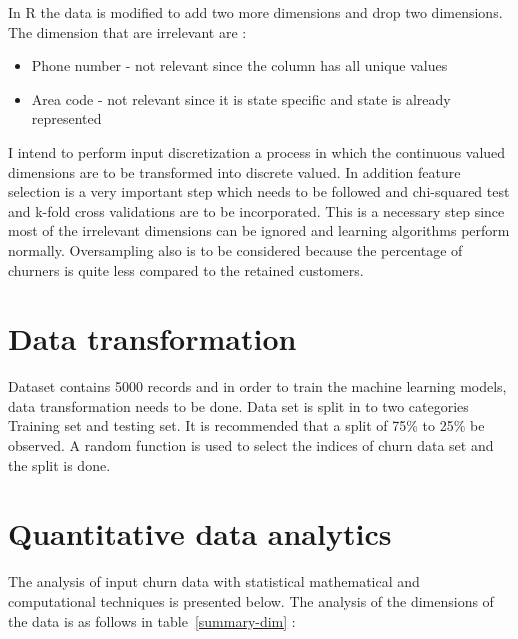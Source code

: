 In R the data is modified to add two more dimensions and drop two dimensions. 
The dimension that are irrelevant are :
\begin{itemize}
	\item Phone number - not relevant since the column has all unique values
	\item Area code - not relevant since it is state specific and state is already represented
\end{itemize}

I intend to perform input discretization a process in which the continuous valued dimensions are to be transformed into discrete valued. 
In addition feature selection is a very important step which needs to be followed and chi-squared test and k-fold cross validations are to be incorporated. This is a necessary step since most of the irrelevant dimensions can be ignored and learning algorithms perform normally.
Oversampling also is to be considered because the percentage of churners is quite less compared to the retained customers.

\section{Data transformation}
Dataset contains 5000 records and in order to train the machine learning models, data transformation needs to be done.
Data set is split in to two categories Training set and testing set. It is recommended that a split of 75\% to 25\% be observed.
A random function is used to select the indices of churn data set and the split is done.


\section{Quantitative data analytics}
The analysis of input churn data with statistical mathematical and computational techniques is presented below.
The analysis of the dimensions of the data is as follows in table~\ref{summary-dim} :

